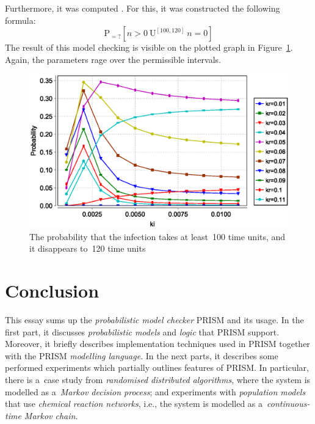 \documentclass[a4paper, 11pt]{article}
\theoremstyle{definition}
\begin{document}
Furthermore, it was computed . For this, it was constructed
the following formula:
$$
    \mathrm{P}_{= ?} [n > 0\ \mathrm{U}^{[100, 120]}\ n = 0]
$$
The result of this model checking is visible on the plotted graph
in Figure~\ref{fig:customExpsExp2}. Again, the parameters rage over
the permissible intervals.

\begin{figure}[hbt]
    \centering
    \includegraphics[width=.7 \linewidth]{custom-exp-2.eps}
    \caption{%
        The probability that the infection takes at least~100 time units,
        and it disappears to~120 time units%
    }
    \label{fig:customExpsExp2}
\end{figure}


\section{Conclusion}
\label{sec:con}

This essay sums up the \emph{probabilistic model checker} PRISM and its
usage. In the first part, it discusses \emph{probabilistic models}
and \emph{logic} that PRISM support. Moreover, it briefly describes
implementation techniques used in PRISM together with the PRISM
\emph{modelling language}. In the next parts, it describes some
performed experiments which partially outlines features of PRISM. In
particular, there is a~case study from \emph{randomised distributed
algorithms}, where the system is modelled as a~\emph{Markov decision
process}; and experiments with \emph{population models} that use
\emph{chemical reaction networks}, i.e., the system is modelled as
a~\emph{continuous-time Markov chain}.


\clearpage


\end{document}

